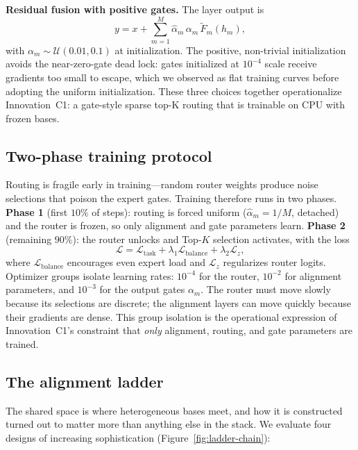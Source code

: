 \documentclass[10pt,twoside]{article}
\theoremstyle{definition}
\begin{document}
\textbf{Residual fusion with positive gates.} The layer output is
\begin{equation}
\label{eq:fuse}
y = x + \sum_{m=1}^{M} \hat\alpha_m \, \alpha_m \, \tilde F_m(h_m),
\end{equation}
with $\alpha_m \sim \mathcal{U}(0.01, 0.1)$ at initialization. The positive, non-trivial initialization avoids the near-zero-gate dead lock: gates initialized at $10^{-4}$ scale receive gradients too small to escape, which we observed as flat training curves before adopting the uniform initialization. These three choices together operationalize Innovation~C1: a gate-style sparse top-K routing that is trainable on CPU with frozen bases.

\subsection{Two-phase training protocol}
\label{sec:training}

Routing is fragile early in training---random router weights produce noise selections that poison the expert gates. Training therefore runs in two phases. \textbf{Phase 1} (first $10\%$ of steps): routing is forced uniform ($\hat\alpha_m = 1/M$, detached) and the router is frozen, so only alignment and gate parameters learn. \textbf{Phase 2} (remaining $90\%$): the router unlocks and Top-$K$ selection activates, with the loss
\begin{equation}
\label{eq:loss}
\mathcal{L} = \mathcal{L}_{\text{task}} + \lambda_1 \mathcal{L}_{\text{balance}} + \lambda_2 \mathcal{L}_{z},
\end{equation}
where $\mathcal{L}_{\text{balance}}$ encourages even expert load and $\mathcal{L}_{z}$ regularizes router logits. Optimizer groups isolate learning rates: $10^{-4}$ for the router, $10^{-2}$ for alignment parameters, and $10^{-3}$ for the output gates $\alpha_m$. The router must move slowly because its selections are discrete; the alignment layers can move quickly because their gradients are dense. This group isolation is the operational expression of Innovation~C1's constraint that \emph{only} alignment, routing, and gate parameters are trained.

\subsection{The alignment ladder}
\label{sec:align}

The shared space is where heterogeneous bases meet, and how it is constructed turned out to matter more than anything else in the stack. We evaluate four designs of increasing sophistication (Figure~\ref{fig:ladder-chain}):
\end{document}
